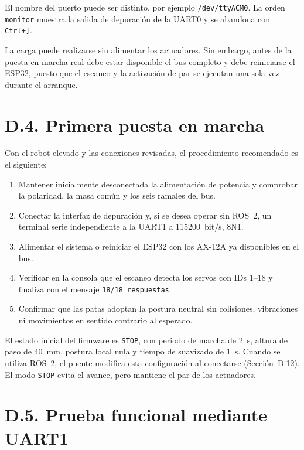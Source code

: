 El nombre del puerto puede ser distinto, por ejemplo \texttt{/dev/ttyACM0}. La
orden \texttt{monitor} muestra la salida de depuración de la UART0 y se abandona
con \texttt{Ctrl+]}.

La carga puede realizarse sin alimentar los actuadores. Sin embargo, antes de
la puesta en marcha real debe estar disponible el bus completo y debe
reiniciarse el ESP32, puesto que el escaneo y la activación de par se ejecutan
una sola vez durante el arranque.

\section*{D.4. Primera puesta en marcha}

Con el robot elevado y las conexiones revisadas, el procedimiento recomendado
es el siguiente:

\begin{enumerate}[leftmargin=*,label=\arabic*.]
    \item Mantener inicialmente desconectada la alimentación de potencia y
          comprobar la polaridad, la masa común y los seis ramales del bus.
    \item Conectar la interfaz de depuración y, si se desea operar sin ROS~2,
          un terminal serie independiente a la UART1 a 115200~bit/s, 8N1.
    \item Alimentar el sistema o reiniciar el ESP32 con los AX-12A ya
          disponibles en el bus.
    \item Verificar en la consola que el escaneo detecta los servos con IDs
          1--18 y finaliza con el mensaje \texttt{18/18 respuestas}.
    \item Confirmar que las patas adoptan la postura neutral sin colisiones,
          vibraciones ni movimientos en sentido contrario al esperado.
\end{enumerate}

El estado inicial del firmware es \texttt{STOP}, con periodo de marcha de 2~s, altura de
paso de 40~mm, postura local nula y tiempo de suavizado de 1~s. Cuando se
utiliza ROS~2, el puente modifica esta configuración al conectarse
(Sección~D.12). El modo
\texttt{STOP} evita el avance, pero mantiene el par de los actuadores.

\section*{D.5. Prueba funcional mediante UART1}

